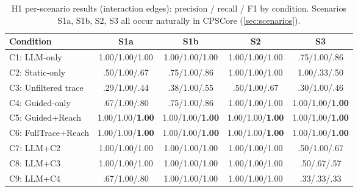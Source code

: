 \begin{table}[htb]
\centering
\caption{H1 per-scenario results (interaction edges): precision / recall
  / F1 by condition. Scenarios S1a, S1b, S2, S3 all occur naturally in
  CPSCore (\cref{sec:scenarios}).}
\label{tab:h1-per-scenario}
\small
\begin{tabular}{@{} l c c c c @{}}
\toprule
\textbf{Condition} & \textbf{S1a} & \textbf{S1b} & \textbf{S2} & \textbf{S3} \\
\midrule
C1: LLM-only            & 1.00/1.00/1.00 & 1.00/1.00/1.00 & 1.00/1.00/1.00 & .75/1.00/.86 \\
C2: Static-only         & .50/1.00/.67   & .75/1.00/.86   & 1.00/1.00/1.00 & 1.00/.33/.50 \\
C3: Unfiltered trace    & .29/1.00/.44   & .38/1.00/.55   & .50/1.00/.67   & .30/1.00/.46 \\
C4: Guided-only         & .67/1.00/.80   & .75/1.00/.86   & 1.00/1.00/1.00 & 1.00/1.00/\textbf{1.00} \\
C5: Guided+Reach        & 1.00/1.00/\textbf{1.00} & 1.00/1.00/\textbf{1.00} & 1.00/1.00/\textbf{1.00} & 1.00/1.00/\textbf{1.00} \\
C6: FullTrace+Reach     & 1.00/1.00/\textbf{1.00} & 1.00/1.00/\textbf{1.00} & 1.00/1.00/\textbf{1.00} & 1.00/1.00/\textbf{1.00} \\
C7: LLM+C2              & 1.00/1.00/1.00 & 1.00/1.00/1.00 & 1.00/1.00/1.00 & .50/1.00/.67 \\
C8: LLM+C3              & 1.00/1.00/1.00 & 1.00/1.00/1.00 & 1.00/1.00/1.00 & .50/.67/.57 \\
C9: LLM+C4              & .67/1.00/.80   & 1.00/1.00/1.00 & 1.00/1.00/1.00 & .33/.33/.33 \\
\bottomrule
\end{tabular}
\end{table}

